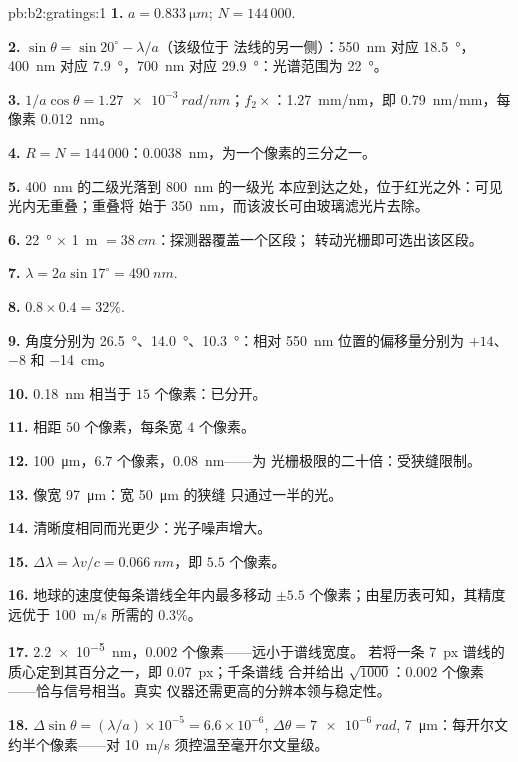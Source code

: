 \begin{solution}{pb:b2:gratings:1}
\textbf{1.} $a = \qty{0.833}{\micro m}$; $N = 144\,000$.

\textbf{2.} $\sin\theta = \sin20^\circ - \lambda/a$（该级位于
法线的另一侧）：\qty{550}{nm} 对应 \qty{18.5}{\degree}，\qty{400}{nm} 对应 \qty{7.9}{\degree}，\qty{700}{nm} 对应
\qty{29.9}{\degree}：光谱范围为 \qty{22}{\degree}。

\textbf{3.} $1/a\cos\theta = \qty{1.27e-3}{rad/nm}$；$f_2\times$：\qty{1.27}{mm/nm}，即
\qty{0.79}{nm/mm}，每像素 \qty{0.012}{nm}。

\textbf{4.} $R = N = 144\,000$：\qty{0.0038}{nm}，为一个像素的三分之一。

\textbf{5.} \qty{400}{nm} 的二级光落到 \qty{800}{nm} 的一级光
本应到达之处，位于红光之外：可见光内无重叠；重叠将
始于 \qty{350}{nm}，而该波长可由玻璃滤光片去除。

\textbf{6.} \qty{22}{\degree} $\times$ \qty{1}{m} $= \qty{38}{cm}$：探测器覆盖一个区段；
转动光栅即可选出该区段。

\textbf{7.} $\lambda = 2a\sin17^\circ = \qty{490}{nm}$.

\textbf{8.} $0.8 \times 0.4 = 32\%$.

\textbf{9.} 角度分别为 \qty{26.5}{\degree}、\qty{14.0}{\degree}、\qty{10.3}{\degree}：相对 \qty{550}{nm} 位置的偏移量分别为 $+14$、$-8$ 和
\qty{-14}{cm}。

\textbf{10.} \qty{0.18}{nm} 相当于 $15$ 个像素：已分开。

\textbf{11.} 相距 $50$ 个像素，每条宽 $4$ 个像素。

\textbf{12.} \qty{100}{\micro m}，$6.7$ 个像素，\qty{0.08}{nm}——为
光栅极限的二十倍：受狭缝限制。

\textbf{13.} 像宽 \qty{97}{\micro m}：宽 \qty{50}{\micro m} 的狭缝
只通过一半的光。

\textbf{14.} 清晰度相同而光更少：光子噪声增大。

\textbf{15.} $\Delta\lambda = \lambda v/c = \qty{0.066}{nm}$，即 $5.5$ 个像素。

\textbf{16.} 地球的速度使每条谱线全年内最多移动 $\pm5.5$
个像素；由星历表可知，其精度远优于
\qty{100}{m/s} 所需的 $0.3\%$。

\textbf{17.} \qty{2.2e-5}{nm}，$0.002$ 个像素——远小于谱线宽度。
若将一条 \qty{7}{px} 谱线的质心定到其百分之一，即 \qty{0.07}{px}；千条谱线
合并给出 $\sqrt{1000}$：$0.002$ 个像素——恰与信号相当。真实
仪器还需更高的分辨本领与稳定性。

\textbf{18.} $\Delta\sin\theta = (\lambda/a) \times 10^{-5} = 6.6 \times 10^{-6}$, $\Delta\theta = \qty{7e-6}{rad}$,
\qty{7}{\micro m}：每开尔文约半个像素——对 \qty{10}{m/s} 须控温至毫开尔文量级。


\end{solution}
